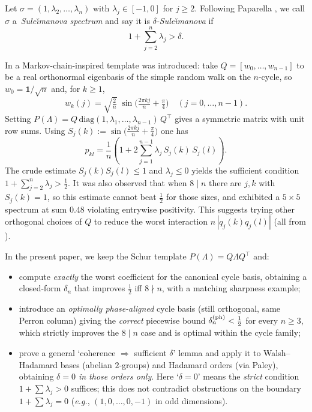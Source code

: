\documentclass[12pt,fleqn]{amsart}
\renewcommand{\le}{\leqslant}
\renewcommand{\ge}{\geqslant}
\theoremstyle{remark}
\newcommand{\1}{\mathbf{1}}
\newcommand{\Lam}{\Lambda}
\begin{document}
Let $\sigma=(1,\lambda_2,\ldots,\lambda_n)$ with $\lambda_j\in[-1,0]$ for $j\ge 2$. Following Paparella \cite{Paparella16}, we call $\sigma$ a~\emph{Sule\u{\i}manova spectrum} and say it is \emph{$\delta$-Sule\u{\i}manova} if
\[
1+\sum_{j=2}^n\lambda_j>\delta .
\]

In \cite{GK20} a Markov-chain-inspired template was introduced: take $Q=[w_0,\ldots,w_{n-1}]$ to be a real orthonormal eigenbasis of the simple random walk on the $n$-cycle, so $w_0=\1/\sqrt n$ and, for $k\ge 1$,
\[
w_k(j)=\sqrt{\tfrac{2}{n}}\;\sin\!\Big(\tfrac{2\pi kj}{n}+\tfrac{\pi}{4}\Big)\quad (j=0,\ldots,n-1).
\]
Setting $P(\Lam)=Q\,\mathrm{diag}(1,\lambda_1,\ldots,\lambda_{n-1})\,Q^\top$ gives a symmetric matrix with unit row sums. Using $S_j(k):=\sin\!\big(\tfrac{2\pi kj}{n}+\tfrac{\pi}{4}\big)$ one has
\[
p_{kl}=\frac1n\!\left(1+2\sum_{j=1}^{n-1}\lambda_j\,S_j(k)\,S_j(l)\right).
\]
The crude estimate $S_j(k)S_j(l)\le 1$ and $\lambda_j\le 0$ yields the sufficient condition $1+\sum_{j=2}^n\lambda_j>\tfrac12$. It was also observed that when $8\mid n$ there are $j,k$ with $S_j(k)=1$, so this estimate cannot beat $\tfrac12$ for those sizes, and exhibited a $5\times 5$ spectrum at sum $0.48$ violating entrywise positivity. This suggests  trying other orthogonal choices of $Q$ to reduce the worst interaction $n\,|q_j(k)q_j(l)|$ (all from \cite{GK20}).

\medskip
In the present paper, we keep the Schur template $P(\Lam)=Q\Lam Q^\top$ and:
\begin{itemize}
\item compute \emph{exactly} the worst coefficient for the canonical cycle basis, obtaining a closed-form $\delta_n$ that improves $\tfrac12$ iff $8\nmid n$, with a matching sharpness example;
\item introduce an \emph{optimally phase-aligned} cycle basis (still orthogonal, same Perron column) giving the \emph{correct} piecewise bound $\delta_n^{\rm (ph)}<\tfrac12$ for every $n\ge3$, which strictly improves the $8\mid n$ case and is optimal within the cycle family;
\item prove a general `coherence $\Rightarrow$ sufficient $\delta$' lemma and apply it to Walsh--Hadamard bases (abelian $2$-groups) and Hadamard orders (via Paley), obtaining \emph{$\delta=0$ in those orders only}. Here `$\delta=0$' means the \emph{strict} condition $1+\sum\lambda_j>0$ suffices; this does not contradict obstructions on the boundary $1+\sum\lambda_j=0$ (\emph{e.g.}, $(1,0,\dots,0,-1)$ in odd dimensions).
\end{itemize}
\end{document}
